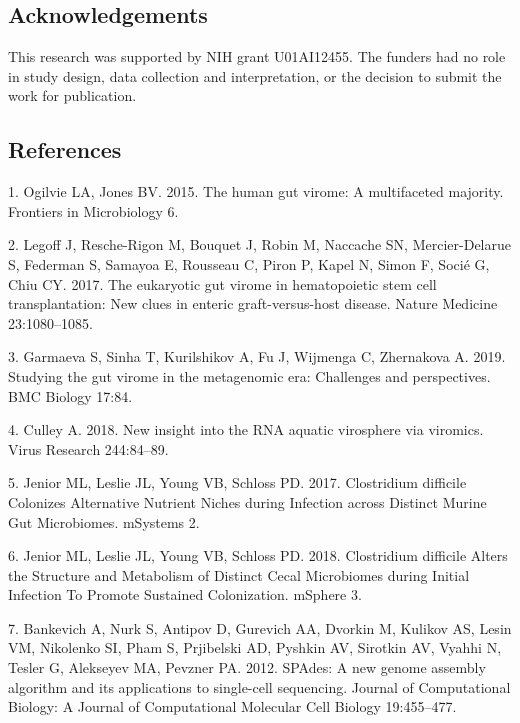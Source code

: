 \documentclass[
  11pt,
]{article}
\begin{document}
\hypertarget{acknowledgements}{%
\subsection{Acknowledgements}\label{acknowledgements}}

This research was supported by NIH grant U01AI12455. The funders had no
role in study design, data collection and interpretation, or the
decision to submit the work for publication.

\newpage

\hypertarget{references}{%
\subsection{References}\label{references}}

\hypertarget{refs}{}
\leavevmode\hypertarget{ref-ogilvie_human_2015}{}%
1. Ogilvie LA, Jones BV. 2015. The human gut virome: A multifaceted
majority. Frontiers in Microbiology 6.

\leavevmode\hypertarget{ref-legoff_eukaryotic_2017}{}%
2. Legoff J, Resche-Rigon M, Bouquet J, Robin M, Naccache SN,
Mercier-Delarue S, Federman S, Samayoa E, Rousseau C, Piron P, Kapel N,
Simon F, Socié G, Chiu CY. 2017. The eukaryotic gut virome in
hematopoietic stem cell transplantation: New clues in enteric
graft-versus-host disease. Nature Medicine 23:1080--1085.

\leavevmode\hypertarget{ref-garmaeva_studying_2019}{}%
3. Garmaeva S, Sinha T, Kurilshikov A, Fu J, Wijmenga C, Zhernakova A.
2019. Studying the gut virome in the metagenomic era: Challenges and
perspectives. BMC Biology 17:84.

\leavevmode\hypertarget{ref-culley_new_2018}{}%
4. Culley A. 2018. New insight into the RNA aquatic virosphere via
viromics. Virus Research 244:84--89.

\leavevmode\hypertarget{ref-jenior_clostridium_2017}{}%
5. Jenior ML, Leslie JL, Young VB, Schloss PD. 2017. Clostridium
difficile Colonizes Alternative Nutrient Niches during Infection across
Distinct Murine Gut Microbiomes. mSystems 2.

\leavevmode\hypertarget{ref-jenior_clostridium_2018}{}%
6. Jenior ML, Leslie JL, Young VB, Schloss PD. 2018. Clostridium
difficile Alters the Structure and Metabolism of Distinct Cecal
Microbiomes during Initial Infection To Promote Sustained Colonization.
mSphere 3.

\leavevmode\hypertarget{ref-bankevich_spades:_2012}{}%
7. Bankevich A, Nurk S, Antipov D, Gurevich AA, Dvorkin M, Kulikov AS,
Lesin VM, Nikolenko SI, Pham S, Prjibelski AD, Pyshkin AV, Sirotkin AV,
Vyahhi N, Tesler G, Alekseyev MA, Pevzner PA. 2012. SPAdes: A new genome
assembly algorithm and its applications to single-cell sequencing.
Journal of Computational Biology: A Journal of Computational Molecular
Cell Biology 19:455--477.
\end{document}
